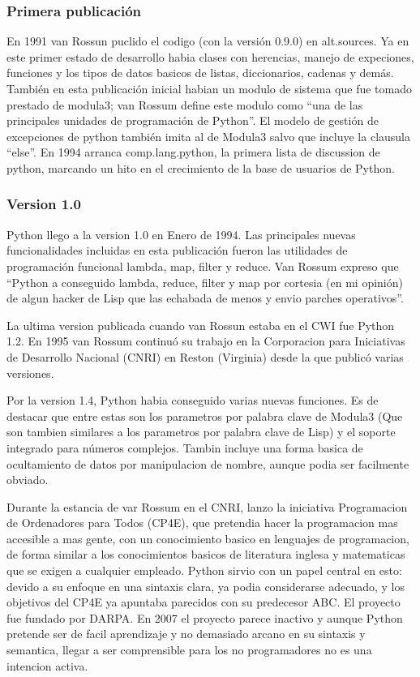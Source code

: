 \documentclass[a4paper,spanish,12pt]{book}
\begin{document}
\subsubsection{Primera publicación}

En 1991 van Rossun puclido el codigo (con la versión 0.9.0) en alt.sources. Ya en este primer estado de desarrollo habia clases con herencias, manejo de expeciones, funciones y los tipos de datos basicos de listas, diccionarios, cadenas y demás. Tambi\'en en esta publicación inicial habian un modulo de sistema que fue tomado prestado de modula3; van Rossum define este modulo como ``una de las principales unidades de programación de Python''. El modelo de gestión de excepciones de python tambi\'en imita al de Modula3 salvo que incluye la clausula ``else''. En 1994 arranca comp.lang.python, la primera lista de discussion de python, marcando un hito en el crecimiento de la base de usuarios de Python.

\subsubsection{Version 1.0}

Python llego a la version 1.0 en Enero de 1994. Las principales nuevas funcionalidades incluidas en esta publicación fueron las utilidades de programación funcional lambda, map, filter y reduce. Van Rossum expreso que ``Python a conseguido lambda, reduce, filter y map por cortesia (en mi opinión) de algun hacker de Lisp que las echabada de menos y envio parches operativos''.

La ultima version publicada cuando van Rossun estaba en el CWI fue Python 1.2. En 1995 van Rossum continuó su trabajo en la Corporacion para Iniciativas de Desarrollo Nacional (CNRI) en Reston (Virginia) desde la que publicó varias versiones.

Por la version 1.4, Python habia conseguido varias nuevas funciones. Es de destacar que entre estas son los parametros por palabra clave de Modula3 (Que son tambien similares a los parametros por palabra clave de Lisp) y el soporte integrado para números complejos. Tambin incluye una forma basica de ocultamiento de datos por manipulacion de nombre, aunque podia ser facilmente obviado.

Durante la estancia de var Rossum en el CNRI, lanzo la iniciativa Programacion de Ordenadores para Todos (CP4E), que pretendia hacer la programacion mas accesible a mas gente, con un conocimiento basico en lenguajes de programacion, de forma similar a los conocimientos basicos de literatura inglesa y matematicas que se exigen a cualquier empleado. Python sirvio con un papel central en esto: devido a su enfoque en una sintaxis clara, ya podia considerarse adecuado, y los objetivos del CP4E ya apuntaba parecidos con su predecesor ABC. El proyecto fue fundado por DARPA. En 2007 el proyecto parece inactivo y aunque Python pretende ser de facil aprendizaje y no demasiado arcano en su sintaxis y semantica, llegar a ser comprensible para los no programadores no es una intencion activa.
\end{document}
